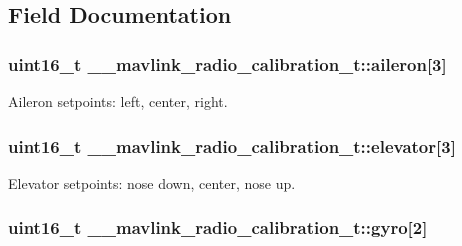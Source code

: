 \subsection{Field Documentation}
\hypertarget{struct____mavlink__radio__calibration__t_aa29e3b252970fbe7d9394295288c704a}{
\subsubsection[{aileron}]{\setlength{\rightskip}{0pt plus 5cm}uint16\+\_\+t \+\_\+\+\_\+mavlink\+\_\+radio\+\_\+calibration\+\_\+t\+::aileron\mbox{[}3\mbox{]}}}\label{struct____mavlink__radio__calibration__t_aa29e3b252970fbe7d9394295288c704a}


Aileron setpoints\+: left, center, right. 

\hypertarget{struct____mavlink__radio__calibration__t_a0ae0f804947ddcbc22ab48419df28b41}{
\subsubsection[{elevator}]{\setlength{\rightskip}{0pt plus 5cm}uint16\+\_\+t \+\_\+\+\_\+mavlink\+\_\+radio\+\_\+calibration\+\_\+t\+::elevator\mbox{[}3\mbox{]}}}\label{struct____mavlink__radio__calibration__t_a0ae0f804947ddcbc22ab48419df28b41}


Elevator setpoints\+: nose down, center, nose up. 

\hypertarget{struct____mavlink__radio__calibration__t_adacea0688be19a8f307227f85c6e9d3e}{
\subsubsection[{gyro}]{\setlength{\rightskip}{0pt plus 5cm}uint16\+\_\+t \+\_\+\+\_\+mavlink\+\_\+radio\+\_\+calibration\+\_\+t\+::gyro\mbox{[}2\mbox{]}}}\label{struct____mavlink__radio__calibration__t_adacea0688be19a8f307227f85c6e9d3e}


